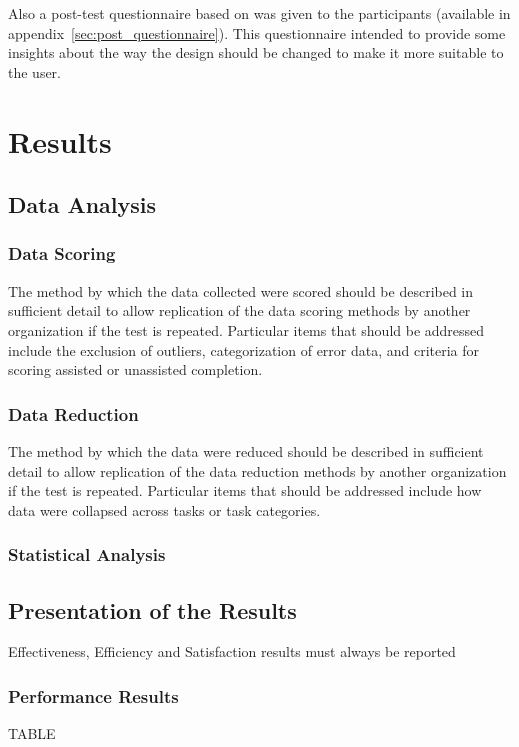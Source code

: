 \documentclass[a4paper]{article}
\begin{document}
 Also a post-test questionnaire based on  was given to the participants (available in appendix~\ref{sec:post_questionnaire}). This questionnaire intended to provide some insights about the way the design should be changed to make it more suitable to the user.
 
 
 \section{Results}
 \subsection{Data Analysis}
 \subsubsection{Data Scoring}
 The method by which the data collected were scored should be described in sufficient detail to allow replication of the data scoring methods by another organization if the test is repeated. Particular items that should be addressed include the exclusion of outliers, categorization of error data, and criteria for scoring assisted or unassisted completion.
  \subsubsection{Data Reduction}
  The method by which the data were reduced should be described in sufficient detail to allow replication of the data reduction methods by another organization if the test is repeated. Particular items that should be addressed include how data were collapsed across tasks or task categories.
   \subsubsection{Statistical Analysis}
   
   \subsection{Presentation of the Results}
   Effectiveness, Efficiency and Satisfaction results must always be reported

\subsubsection{Performance Results}
TABLE

\appendix
\end{document}
